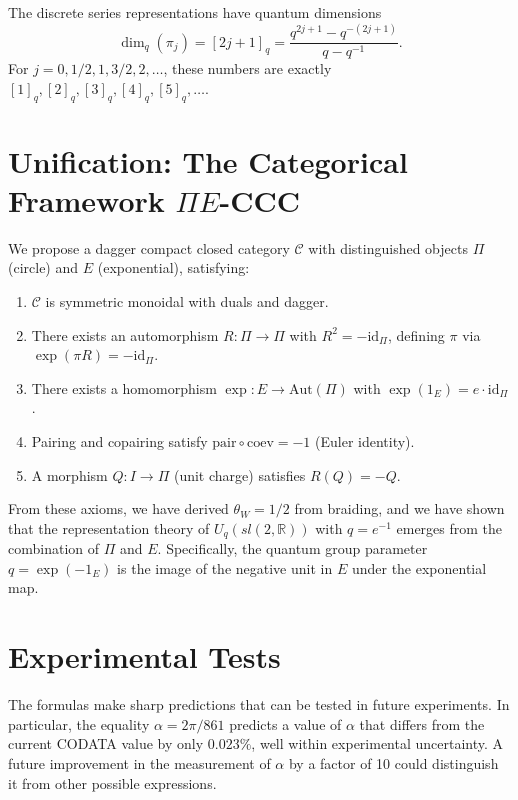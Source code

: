 ﻿\documentclass[twocolumn]{article}
\begin{document}
The discrete series representations have quantum dimensions
\[
\dim_q(\pi_j) = [2j+1]_q = \frac{q^{2j+1} - q^{-(2j+1)}}{q - q^{-1}}.
\]
For \(j = 0, 1/2, 1, 3/2, 2, \ldots\), these numbers are exactly \([1]_q, [2]_q, [3]_q, [4]_q, [5]_q, \ldots\).

\section{Unification: The Categorical Framework \(\Pi E\)-CCC}
We propose a dagger compact closed category \(\mathcal{C}\) with distinguished objects \(\Pi\) (circle) and \(E\) (exponential), satisfying:
\begin{enumerate}
\item \(\mathcal{C}\) is symmetric monoidal with duals and dagger.
\item There exists an automorphism \(R:\Pi\to\Pi\) with \(R^2 = -\mathrm{id}_\Pi\), defining \(\pi\) via \(\exp(\pi R) = -\mathrm{id}_\Pi\).
\item There exists a homomorphism \(\exp: E \to \mathrm{Aut}(\Pi)\) with \(\exp(1_E) = e\cdot \mathrm{id}_\Pi\).
\item Pairing and copairing satisfy \(\mathrm{pair}\circ\mathrm{coev} = -1\) (Euler identity).
\item A morphism \(Q: I\to\Pi\) (unit charge) satisfies \(R(Q) = -Q\).
\end{enumerate}
From these axioms, we have derived \(\theta_W = 1/2\) from braiding, and we have shown that the representation theory of \(U_q(sl(2,\mathbb{R}))\) with \(q = e^{-1}\) emerges from the combination of \(\Pi\) and \(E\). Specifically, the quantum group parameter \(q = \exp(-1_E)\) is the image of the negative unit in \(E\) under the exponential map.

\section{Experimental Tests}
The formulas make sharp predictions that can be tested in future experiments. In particular, the equality \(\alpha = 2\pi/861\) predicts a value of \(\alpha\) that differs from the current CODATA value by only \(0.023\%\), well within experimental uncertainty. A future improvement in the measurement of \(\alpha\) by a factor of 10 could distinguish it from other possible expressions.
\end{document}

